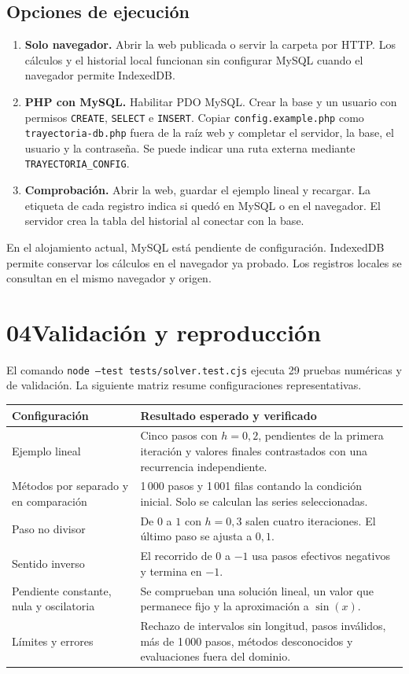 \documentclass[11pt,a4paper]{article}
\newcommand{\topic}[2]{\section*{\sffamily\color{Navy}#1\enspace #2}\vspace{-.35em}}
\newcommand{\subtopic}[1]{\subsection*{\sffamily\color{Blue}#1}}
\newcommand{\callout}[1]{\noindent\colorbox{Pale}{\parbox{\dimexpr\linewidth-2\fboxsep\relax}{\vspace{.45em}\hspace{.5em}\begin{minipage}{\dimexpr\linewidth-1em\relax}#1\end{minipage}\vspace{.45em}}}}
\begin{document}
\subtopic{Opciones de ejecución}
\begin{enumerate}
 \item \textbf{Solo navegador.} Abrir la web publicada o servir la carpeta por HTTP. Los cálculos y el historial local funcionan sin configurar MySQL cuando el navegador permite IndexedDB.
 \item \textbf{PHP con MySQL.} Habilitar PDO MySQL. Crear la base y un usuario con permisos \texttt{CREATE}, \texttt{SELECT} e \texttt{INSERT}. Copiar \texttt{config.example.php} como \texttt{trayectoria-db.php} fuera de la raíz web y completar el servidor, la base, el usuario y la contraseña. Se puede indicar una ruta externa mediante \texttt{TRAYECTORIA\_CONFIG}.
 \item \textbf{Comprobación.} Abrir la web, guardar el ejemplo lineal y recargar. La etiqueta de cada registro indica si quedó en MySQL o en el navegador. El servidor crea la tabla del historial al conectar con la base.
\end{enumerate}

\callout{En el alojamiento actual, MySQL está pendiente de configuración. IndexedDB permite conservar los cálculos en el navegador ya probado. Los registros locales se consultan en el mismo navegador y origen.}

\newpage
\topic{04}{Validación y reproducción}
El comando \texttt{node --test tests/solver.test.cjs} ejecuta 29 pruebas numéricas y de validación. La siguiente matriz resume configuraciones representativas.

\begin{tabularx}{\linewidth}{@{}>{\raggedright\arraybackslash}p{.29\linewidth} X@{}}
\toprule
\textbf{Configuración} & \textbf{Resultado esperado y verificado} \\
\midrule
Ejemplo lineal & Cinco pasos con $h=0{,}2$, pendientes de la primera iteración y valores finales contrastados con una recurrencia independiente. \\
Métodos por separado y en comparación & 1\,000 pasos y 1\,001 filas contando la condición inicial. Solo se calculan las series seleccionadas. \\
Paso no divisor & De $0$ a $1$ con $h=0{,}3$ salen cuatro iteraciones. El último paso se ajusta a $0{,}1$. \\
Sentido inverso & El recorrido de $0$ a $-1$ usa pasos efectivos negativos y termina en $-1$. \\
Pendiente constante, nula y oscilatoria & Se comprueban una solución lineal, un valor que permanece fijo y la aproximación a $\sin(x)$. \\
Límites y errores & Rechazo de intervalos sin longitud, pasos inválidos, más de 1\,000 pasos, métodos desconocidos y evaluaciones fuera del dominio. \\
\bottomrule
\end{tabularx}
\end{document}
